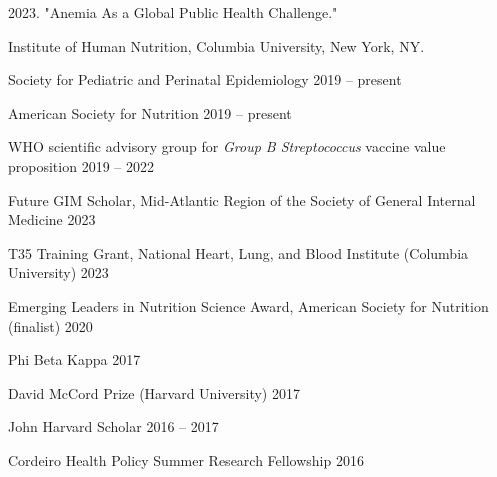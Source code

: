 \documentclass[11pt,article,oneside]{memoir}
\begin{document}
 2023. "Anemia As a Global Public Health Challenge." 

\indent \indent Institute of Human Nutrition, Columbia University, New York, NY.

\newpage

\medskip

\ind Society for Pediatric and Perinatal Epidemiology \hfill 2019 -- present

\ind American Society for Nutrition \hfill 2019 -- present

\ind WHO scientific advisory group for \emph{Group B Streptococcus} vaccine value proposition \hfill 2019 -- 2022

\bigskip


\medskip

\ind Future GIM Scholar, Mid-Atlantic Region of the Society of General Internal Medicine \hfill 2023

\ind T35 Training Grant, National Heart, Lung, and Blood Institute (Columbia University) \hfill 2023

\ind Emerging Leaders in Nutrition Science Award, American Society for Nutrition (finalist) \hfill 2020

\ind Phi Beta Kappa \hfill 2017

\ind David McCord Prize (Harvard University) \hfill 2017

\ind John Harvard Scholar \hfill 2016 -- 2017

\ind Cordeiro Health Policy Summer Research Fellowship \hfill 2016

\bigskip
\end{document}
